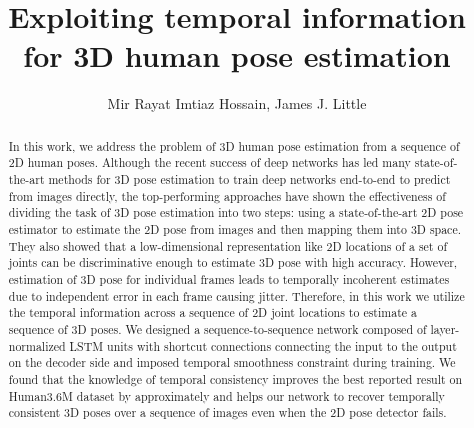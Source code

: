 \documentclass[runningheads]{llncs}
\begin{document}
\pagestyle{headings}
\mainmatter

\title{Exploiting temporal information for 3D human pose estimation} 






\author{Mir Rayat Imtiaz Hossain, James J. Little}





\maketitle

\begin{abstract}
 In this work, we address the problem of 3D human pose estimation from a sequence of 2D human poses. Although the recent success of deep networks has led many state-of-the-art methods for 3D pose estimation to train deep networks end-to-end to predict from images directly, the top-performing approaches have shown the effectiveness of dividing the task of 3D pose estimation into two steps: using a state-of-the-art 2D pose estimator to estimate the 2D pose from images and then mapping them into 3D space. They also showed that a low-dimensional representation like 2D locations of a set of joints can be discriminative enough to estimate 3D pose with high accuracy. However, estimation of 3D pose for individual frames leads to temporally incoherent estimates due to independent error in each frame causing jitter. Therefore, in this work we utilize the temporal information across a sequence of 2D joint locations to estimate a sequence of 3D poses. We designed a sequence-to-sequence network composed of layer-normalized LSTM units with shortcut connections connecting the input to the output on the decoder side and imposed temporal smoothness constraint during training. We found that the knowledge of temporal consistency improves the best reported result on Human3.6M dataset by approximately  and helps our network to recover temporally consistent 3D poses over a sequence of images even when the 2D pose detector fails. 

\end{abstract}
\end{document}
